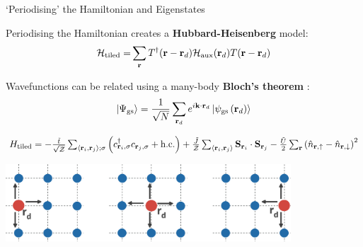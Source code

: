 \documentclass[12pt,aspectratio=169]{beamer}
\newcommand\focus[1]{%
	{\alert{\textbf{#1}}}
}
\begin{document}
\begin{frame}{`Periodising' the Hamiltonian and Eigenstates}
	\begin{minipage}{0.45\textwidth}
		Periodising the Hamiltonian creates a \focus{Hubbard-Heisenberg} model:
	\begin{equation*}\begin{aligned}
		\mathcal{H}_\text{tiled} =& \sum_{{\bf r}}T^\dagger({\bf r} - {\bf r}_d)\mathcal{H}_\text{aux}({\bf r}_d)T({\bf r} - {\bf r}_d)\\
	\end{aligned}\end{equation*}
	\end{minipage}
	\hspace{\fill}
	\begin{minipage}{0.45\textwidth}
		Wavefunctions can be related using a many-body \focus{Bloch's theorem}:
	\[\ket{\Psi_\text{gs}} = \frac{1}{\sqrt N}\sum_{{\bf r}_d} e^{i {\bf k}\cdot{\bf r}_d} \ket{\psi_\text{gs}\left({\bf r}_d\right)}\]

	\end{minipage}

	\vspace*{\fill}
	\(H_\text{tiled} = -\frac{\tilde t}{\sqrt{\mathcal{Z}}}\sum_{\left<{\bf r}_i, {\bf r}_j\right>;\sigma}\left(c^\dagger_{{\bf r}_i,\sigma}c_{{\bf r}_j,\sigma} + \text{h.c.}\right) + \frac{\tilde J}{\mathcal{Z}}\sum_{\left< {\bf r}_i, {\bf r}_j\right>}{\bf S}_{{\bf r}_i}\cdot{\bf S}_{{\bf r}_j} - \frac{\tilde U}{2}\sum_{\bf r}\left(\hat n_{{\bf r} , \uparrow} - \hat n_{{\bf r} , \downarrow}\right)^2\)

	\vspace*{15pt}
	\includegraphics[width=0.8\textwidth]{periodisation.pdf}
	
\end{frame}
\end{document}
